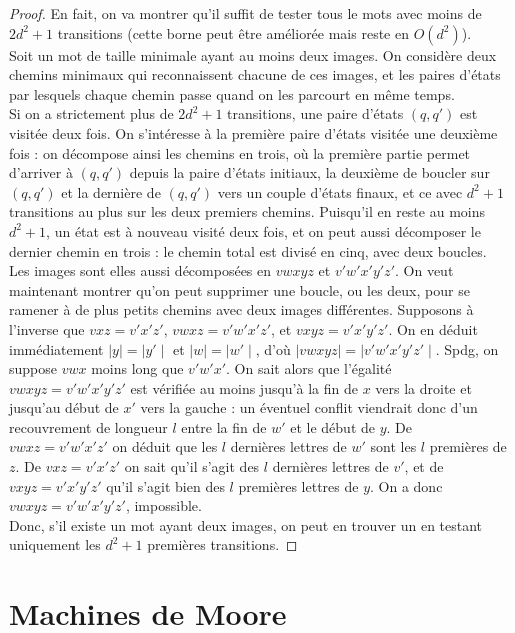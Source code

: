 \documentclass{scrartcl}
\begin{document}
\begin{flushleft}
\begin{proof}
    En fait, on va montrer qu'il suffit de tester tous le mots avec moins de $2d^2+1$ transitions (cette borne peut être améliorée
    mais reste en $O(d^2)$).\\
    Soit un mot de taille minimale ayant au moins deux images. On considère deux chemins minimaux qui reconnaissent
    chacune de ces images, et les paires d'états par lesquels chaque chemin passe quand on les parcourt en même temps.\\
    Si on a strictement plus de $2d^2+1$ transitions, une paire d'états $(q,q')$ est visitée deux fois. On s'intéresse à la première paire
    d'états visitée une deuxième fois : on décompose ainsi les chemins en trois, où la première partie permet d'arriver à $(q, q')$
    depuis la paire d'états initiaux, la deuxième de boucler sur $(q,q')$ et la dernière de $(q,q')$ vers un couple d'états finaux, et ce
    avec $d^2+1$ transitions au plus sur les deux premiers chemins. Puisqu'il en reste au moins $d^2+1$, un état est à nouveau
    visité deux fois, et on peut aussi décomposer le dernier chemin en trois : le chemin total est divisé en cinq, avec deux boucles.\\
    Les images sont elles aussi décomposées en $vwxyz$ et $v'w'x'y'z'$. On veut maintenant montrer qu'on peut supprimer une
    boucle, ou les deux, pour se ramener à de plus petits chemins avec deux images différentes. Supposons à l'inverse que
    $vxz=v'x'z'$, $vwxz=v'w'x'z'$, et $vxyz=v'x'y'z'$. On en déduit immédiatement $\mid y \mid= \mid y' \mid$ et $\mid w\mid=\mid w'\mid$,
    d'où $\mid vwxyz\mid = \mid v'w'x'y'z' \mid$. Spdg, on suppose $vwx$ moins long que $v'w'x'$. On sait alors que l'égalité
    $vwxyz=v'w'x'y'z'$ est vérifiée au moins jusqu'à la fin de $x$ vers la droite et jusqu'au début de $x'$ vers la gauche : un éventuel
    conflit viendrait donc d'un recouvrement de longueur $l$ entre la fin de $w'$ et le début de $y$. De $vwxz=v'w'x'z'$ on déduit
    que les $l$ dernières lettres de $w'$ sont les $l$ premières de $z$. De $vxz=v'x'z'$ on sait qu'il s'agit des $l$ dernières lettres de
    $v'$, et de $vxyz=v'x'y'z'$ qu'il s'agit bien des $l$ premières lettres de $y$. On a donc $vwxyz=v'w'x'y'z'$, impossible.\\
    Donc, s'il existe un mot ayant deux images, on peut en trouver un en testant uniquement les $d^2+1$ premières transitions.

\end{proof}

\section{Machines de Moore}


\end{flushleft}
\end{document}
